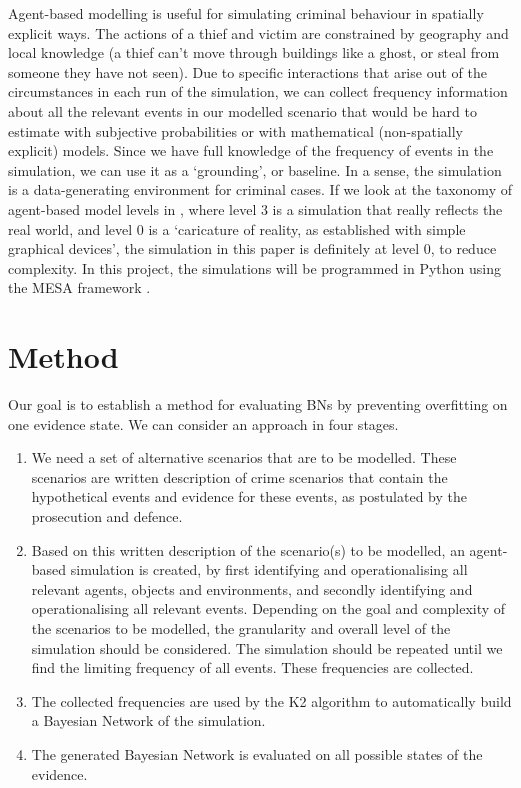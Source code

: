 \documentclass[11pt]{article}
\begin{document}
Agent-based modelling is useful for simulating criminal behaviour in spatially explicit ways. The actions of a thief and victim are constrained by geography and local knowledge (a thief can't move through buildings like a ghost, or steal from someone they have not seen). Due to specific interactions that arise out of the circumstances in each run of the simulation, we can collect frequency information about all the relevant events in our modelled scenario that would be hard to estimate with subjective probabilities or with mathematical (non-spatially explicit) models. Since we have full knowledge of the frequency of events in the simulation, we can use it as a `grounding', or baseline. In a sense, the simulation is a data-generating environment for criminal cases. If we look at the taxonomy of agent-based model levels in \citep{gilbert2005}, where level 3 is a simulation that really reflects the real world, and level 0 is a `caricature of reality, as established with simple graphical devices', the simulation in this paper is definitely at level 0, to reduce complexity. In this project, the simulations will be programmed in Python using the MESA framework  \citep{mesa2020}.

\section{Method}

Our goal is to establish a method for evaluating BNs by preventing overfitting on one evidence state. We can consider an approach in four stages.

\begin{enumerate}
\item We need a set of alternative scenarios that are to be modelled. These scenarios are written description of crime scenarios that contain the hypothetical events and evidence for these events, as postulated by the prosecution and defence. 

\item Based on this written description of the scenario(s) to be modelled, an agent-based simulation is created, by first identifying and operationalising all relevant agents, objects and environments, and secondly identifying and operationalising all relevant events. Depending on the goal and complexity of the scenarios to be modelled, the granularity and overall level of the simulation should be considered. The simulation should be repeated until we find the limiting frequency of all events. These frequencies are collected.

\item The collected frequencies are used by the K2 algorithm to automatically build a Bayesian Network of the simulation. 

\item The generated Bayesian Network is evaluated on all possible states of the evidence.

\end{enumerate}
\end{document}
